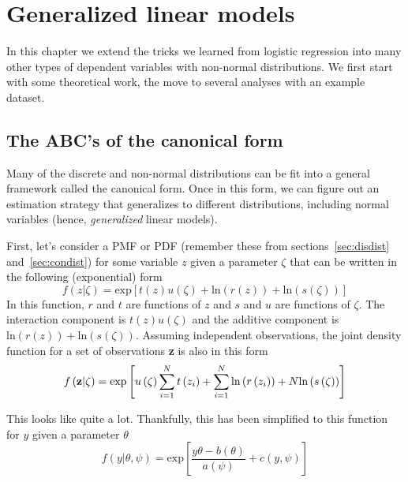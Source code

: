 


\chapter{Generalized linear models}
\label{sec:chapterglm}

In this chapter we extend the tricks we learned from logistic regression into many other types of dependent variables with non-normal distributions. We first start with some theoretical work, the move to several analyses with an example dataset.

\section{The ABC's of the canonical form}

Many of the discrete and non-normal distributions can be fit into a general framework called the canonical form. Once in this form, we can figure out an estimation strategy that generalizes to different distributions, including normal variables (hence, {\it generalized} linear models).

First, let's consider a PMF or PDF (remember these from sections~\ref{sec:disdist} and~\ref{sec:condist}) for some variable $z$ given a parameter $\zeta$ that can be written in the following (exponential) form
\begin{equation}
f\left(z|\zeta\right)=\mbox{exp}\left[t\left(z\right)u\left(\zeta\right)+\mbox{ln}\left(r\left(z\right)\right)+\mbox{ln}\left(s\left(\zeta\right)\right)\right]
\end{equation}
In this function, $r$ and $t$ are functions of $z$ and $s$ and $u$ are functions of $\zeta$. The interaction component is $t\left(z\right)u\left(\zeta\right)$ and the additive component is $\mbox{ln}\left(r\left(z\right)\right)+\mbox{ln}\left(s\left(\zeta\right)\right)$. Assuming independent observations, the joint density function for a set of observations {\bf z} is also in this form
\begin{equation}
f\left({\bf z}|\zeta\right)=\mbox{exp}\left[ u\left(\zeta\right) \sum_{i=1}^{N}t\left(z_i\right)+\sum_{i=1}^N\mbox{ln}\left(r\left(z_i\right)\right)+N\mbox{ln}\left(s\left(\zeta\right)\right)\right]
\end{equation}

This looks like quite a lot. Thankfully, this has been simplified to this function for $y$ given a parameter $\theta$
\begin{equation}\label{eq:canonical}
f\left(y|\theta,\psi\right) = \mbox{exp}\left[\frac{y\theta-b\left(\theta\right)}{a\left(\psi\right)}+c\left(y,\psi\right)\right]
\end{equation}

